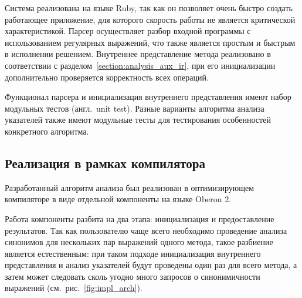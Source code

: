 \documentclass[14pt,titlepage]{extarticle}
\newcommand{\eng}[1]{{\English#1}}
\newcommand{\engdef}[1]{(англ.~\eng{#1})}
\begin{document}
      Система реализована на языке \eng{Ruby}, так как он позволяет очень
      быстро создать работающее приложение, для которого скорость работы не
      является критической характеристикой. Парсер осуществляет разбор входной
      программы с использованием регулярных выражений, что также является
      простым и быстрым в исполнении решением. Внутреннее представление метода
      реализовано в соответствии с разделом~\ref{section:analysis_aux_ir},
      при его инициализации дополнительно проверяется корректность всех
      операций.

      Функционал парсера и инициализация внутреннего представления
      имеют набор модульных тестов \engdef{unit test}. Разные варианты
      алгоритма анализа указателей также имеют модульные тесты для тестирования
      особенностей конкретного алгоритма.

    \subsection{Реализация в рамках компилятора}

      Разработанный алгоритм анализа был реализован в оптимизирующем
      компиляторе в виде отдельной компоненты на языке \eng{Oberon} 2.

      Работа компоненты разбита на два этапа: инициализация и предоставление
      результатов. Так как пользователю чаще всего необходимо проведение
      анализа синонимов для нескольких пар выражений одного метода, такое
      разбиение является естественным: при таком подходе инициализация
      внутреннего представления и анализ указателей будут проведены один раз
      для всего метода, а затем может следовать сколь угодно много запросов о
      синонимичности выражений (см.~рис.~\ref{fig:impl_arch}).
\end{document}
